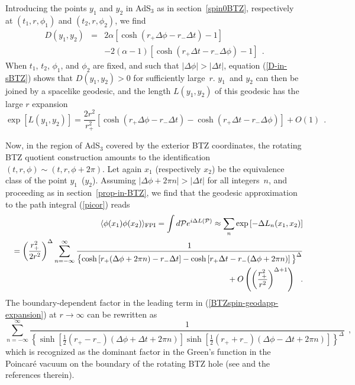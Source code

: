 \documentclass[a4paper,12pt]{article}
\begin{document}
Introducing the points 
$y_1$ and $y_2$ in AdS$_3$ as in section~\ref{spin0BTZ},  
respectively at 
$(t_1,r,\phi_1)$ and
$(t_2,r,\phi_2)$, we find 
\begin{eqnarray}
D(y_1,y_2) 
&=& 
2\alpha
\left[ \cosh(r_+\Delta \phi- r_- \Delta t) -1 \right] 
\nonumber
\\
&& 
- 
2 (\alpha -1)
\left[ \cosh(r_+ \Delta t - r_- \Delta \phi ) -1 \right]
\ \ . 
\label{D-in-sBTZ}
\end{eqnarray}
When $t_1$, $t_2$, $\phi_1$, and $\phi_2$ are fixed, 
and such that $|\Delta \phi| > |\Delta t|$, 
equation 
(\ref{D-in-sBTZ}) shows that $D(y_1,y_2)>0$ for sufficiently
large~$r$. $y_1$~and $y_2$ can then be joined by a spacelike
geodesic, and the length 
$L(y_1,y_2)$ of this geodesic has the large $r$ expansion
\begin{equation}
\exp\left[L(y_1,y_2)\right]
= 
\frac{2 r^2}{r_+^2} 
\left[
\cosh(r_+\Delta \phi - r_- \Delta t) 
- \cosh(r_+\Delta t - r_- \Delta \phi ) 
\right]
+ O\left( 1 \right) 
\ \ . 
\label{L-expr-spin}
\end{equation}

Now, in 
the region of AdS$_3$ 
covered by the exterior BTZ coordinates, the rotating
BTZ quotient construction amounts to the identification $(t,r,\phi)
\sim (t,r,\phi+2\pi)$.  Let again $x_1$ (respectively $x_2$) be the
equivalence class of the point $y_1$~($y_2$). Assuming $|\Delta \phi +
2\pi n| > |\Delta t|$ for all integers~$n$, and proceeding as in
section~\ref{prop-in-BTZ}, we find that the geodesic approximation to
the path integral (\ref{picor}) reads
\begin{eqnarray}
&&\langle \phi (x_1) \phi(x_2) \rangle_{\rm FPI} 
= \int d{\cal P} e^{i
\Delta L({\cal P})}
\approx 
\sum_n\exp\left[-\Delta L_n(x_1,x_2)\right]
\nonumber
\\
&&=
\left(\frac{r_+^2}{2 r^2} \right)^\Delta
\sum_{n=-\infty}^{\infty} 
\frac{1}
{
\left\{
\cosh\left[r_+(\Delta \phi+ 2\pi n ) - r_-\Delta t \right] - 
\cosh\left[r_+\Delta t - r_- (\Delta \phi + 2\pi n ) \right]
\vphantom{A^A_A}
\right\}^\Delta
}
\nonumber
\\
&&
\phantom{xx}
+ 
O\left( \left( \frac{r_+^2}
{r^2} \right)^{\Delta+1}
\right) 
\ \ . 
\label{BTZspin-geodapp-expansion} 
\end{eqnarray}
The boundary-dependent factor in the leading term in 
(\ref{BTZspin-geodapp-expansion}) at $r\to\infty$ can be rewritten as 
\begin{equation}
\sum_{n=-\infty}^{\infty} 
\frac{1}
{
\left\{
\sinh
\left[ 
\frac{1}{2} 
(r_+ - r_-)(\Delta \phi + \Delta t + 2\pi n)
\right]
\sinh
\left[ 
\frac{1}{2}
(r_+ + r_-)(\Delta \phi - \Delta t + 2\pi n)
\right]
\right\}^\Delta
}
\ \ , 
\end{equation}
which is recognized as the dominant factor in the Green's function in
the Poincar\'e vacuum on the boundary of the rotating BTZ hole (see
\cite{esko1} and the references therein).
\end{document}

